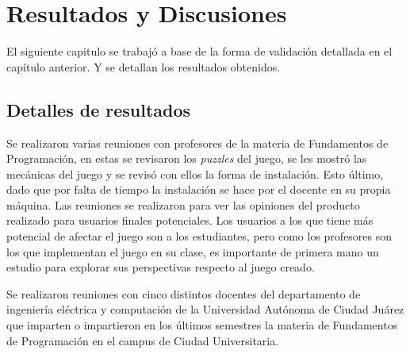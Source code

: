 \chapter{Resultados y Discusiones}
El siguiente capitulo se trabajó a base de la forma de validación detallada en el capítulo anterior. Y se detallan los resultados obtenidos.

\section{Detalles de resultados}
Se realizaron varias reuniones con profesores de la materia de Fundamentos de Programación, en estas se revisaron los \textit{puzzles} del juego, se les mostró las mecánicas del juego y se revisó con ellos la forma de instalación. Esto último, dado que por falta de tiempo la instalación se hace por el docente en su propia máquina. Las reuniones se realizaron para ver las opiniones del producto realizado para usuarios finales potenciales. Los usuarios a los que tiene más potencial de afectar el juego son a los estudiantes, pero como los profesores son los que implementan el juego en su clase, es importante de primera mano un estudio para explorar sus perspectivas respecto al juego creado.

Se realizaron reuniones con cinco distintos docentes del departamento de ingeniería eléctrica y computación de la Universidad Autónoma de Ciudad Juárez que imparten o impartieron en los últimos semestres la materia de Fundamentos de Programación en el campus de Ciudad Universitaria.

